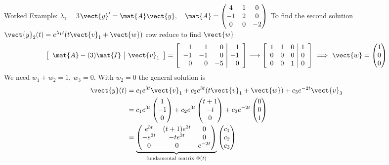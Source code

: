 \documentclass[11pt,aspectratio=169]{beamer}
\begin{document}
\begin{frame}{Worked Example: \(\lambda_1=3\)\quad \(\vect{y}'=\mat{A}\vect{y},\quad \mat{A}=\begin{pmatrix}4&1&0\\-1&2&0\\0&0&-2\end{pmatrix}\)}
\small
\setlength{\abovedisplayskip}{3pt}
\setlength{\belowdisplayskip}{3pt}
\setlength{\jot}{1pt}
\renewcommand{\arraystretch}{0.85}
To find the second solution \(\vect{y}_2(t)=e^{\lambda_1 t}(t\vect{v}_1+\vect{w})\) row reduce to find \(\vect{w}\)
\[
\left[\begin{array}{c|c}\mat{A}-(3)\mat{I}&\vect{v}_1\end{array}\right]=\left[\begin{array}{rrr|r}1&1&0&1\\-1&-1&0&-1\\0&0&-5&0\end{array}\right]
\longrightarrow
\left[\begin{array}{rrr|r}1&1&0&1\\0&0&0&0\\0&0&1&0\end{array}\right]
\ \Longrightarrow\ \vect{w}=\begin{pmatrix}1\\0\\0\end{pmatrix}
\]
We need \(w_1+w_2=1,\ w_3=0\). With \(w_2=0\) 
the general solution is
\[
\begin{aligned}
\vect{y}(t)
 &=c_1e^{3t}\vect{v}_1+c_2e^{3t}(t\vect{v}_1+\vect{w})+c_3e^{-2t}\vect{v}_3\\
 &=c_1e^{3t}\begin{pmatrix}1\\-1\\0\end{pmatrix}
   +c_2e^{3t}\begin{pmatrix}t+1\\-t\\0\end{pmatrix}
   +c_3e^{-2t}\begin{pmatrix}0\\0\\1\end{pmatrix}\\
 &=\underbrace{\begin{pmatrix}
 e^{3t}&(t+1)e^{3t}&0\\
 -e^{3t}&-t e^{3t}&0\\
 0&0&e^{-2t}
 \end{pmatrix}}_{\text{fundamental matrix }\Phi(t)}
 \begin{pmatrix}c_1\\c_2\\c_3\end{pmatrix}
\end{aligned}
\]
\end{frame}
\endgroup

\end{document}
